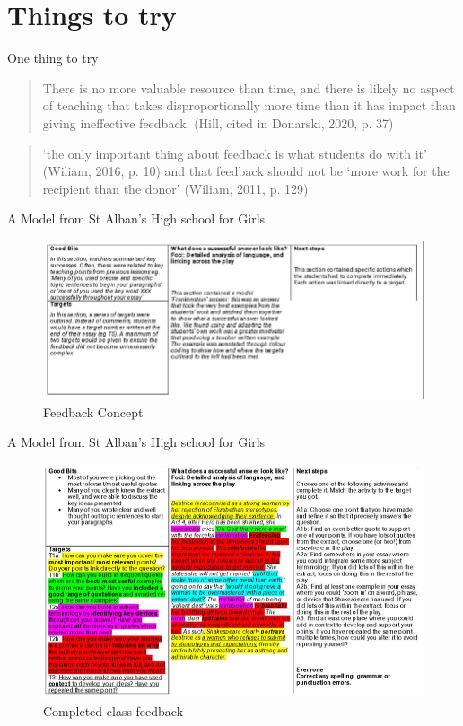 \documentclass{beamer}					%
\begin{document}
\section{Things to try}
\begin{frame}{One thing to try}
\begin{quote}
    There is no more valuable resource than time, and there is likely no aspect of teaching that takes disproportionally more time than it has impact than giving ineffective feedback. (Hill, cited in Donarski, 2020, p. 37)
\end{quote}
\vspace{1cm}
\begin{quote}
  ‘the only important thing about feedback is what students do with it’ (Wiliam, 2016, p. 10) and that feedback should not be ‘more work for the recipient than the donor’ (Wiliam, 2011, p. 129) 
\end{quote}


\end{frame}
\begin{frame}{A Model from St Alban's High school for Girls}
    \begin{figure}
        \centering
        \includegraphics[width=1\linewidth]{figures/ModelFeedback.png}
        \caption{Feedback Concept}
    \end{figure}
\end{frame}
\begin{frame}{A Model from St Alban's High school for Girls}
    \begin{figure}
        \centering
        \includegraphics[width=1\linewidth]{figures/completedfeedback.png}
        \caption{Completed class feedback}
    \end{figure}
\end{frame}
\end{document}
